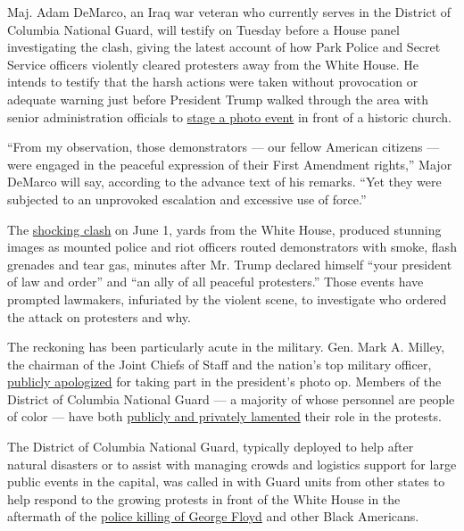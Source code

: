 Maj. Adam DeMarco, an Iraq war veteran who currently serves in the
District of Columbia National Guard, will testify on Tuesday before a
House panel investigating the clash, giving the latest account of how
Park Police and Secret Service officers violently cleared protesters
away from the White House. He intends to testify that the harsh actions
were taken without provocation or adequate warning just before President
Trump walked through the area with senior administration officials to
\href{https://www.nytimes.com/2020/06/01/us/politics/trump-st-johns-church-bible.html}{stage
a photo event} in front of a historic church.

``From my observation, those demonstrators --- our fellow American
citizens --- were engaged in the peaceful expression of their First
Amendment rights,'' Major DeMarco will say, according to the advance
text of his remarks. ``Yet they were subjected to an unprovoked
escalation and excessive use of force.''

The
\href{https://www.nytimes.com/2020/06/02/us/politics/trump-walk-lafayette-square.html}{shocking
clash} on June 1, yards from the White House, produced stunning images
as mounted police and riot officers routed demonstrators with smoke,
flash grenades and tear gas, minutes after Mr. Trump declared himself
``your president of law and order'' and ``an ally of all peaceful
protesters.'' Those events have prompted lawmakers, infuriated by the
violent scene, to investigate who ordered the attack on protesters and
why.

The reckoning has been particularly acute in the military. Gen. Mark A.
Milley, the chairman of the Joint Chiefs of Staff and the nation's top
military officer,
\href{https://www.nytimes.com/2020/06/11/us/politics/trump-milley-military-protests-lafayette-square.html}{publicly
apologized} for taking part in the president's photo op. Members of the
District of Columbia National Guard --- a majority of whose personnel
are people of color --- have both
\href{https://www.nytimes.com/2020/06/10/us/politics/national-guard-protests.html}{publicly
and privately lamented} their role in the protests.

The District of Columbia National Guard, typically deployed to help
after natural disasters or to assist with managing crowds and logistics
support for large public events in the capital, was called in with Guard
units from other states to help respond to the growing protests in front
of the White House in the aftermath of the
\href{https://www.nytimes.com/news-event/george-floyd-protests-minneapolis-new-york-los-angeles}{police
killing of George Floyd} and other Black Americans.

